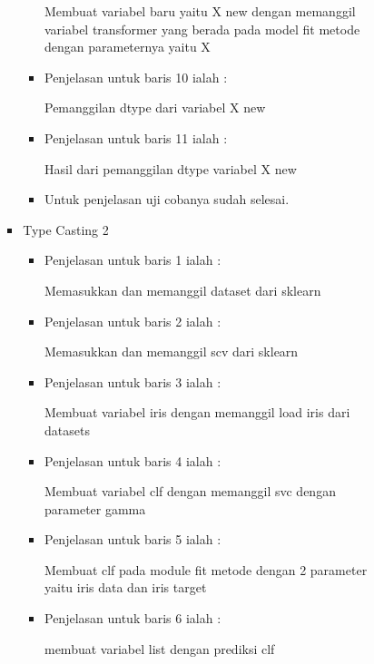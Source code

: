 \begin{enumerate}
\begin{itemize}
\begin{enumerate}
\begin{itemize}
\begin{itemize}
\par Membuat variabel baru yaitu X new dengan memanggil variabel transformer yang berada pada model fit metode dengan parameternya yaitu X
\par
\item Penjelasan untuk baris 10 ialah :
\par Pemanggilan dtype dari variabel X new
\par
\item Penjelasan untuk baris 11 ialah :
\par Hasil dari pemanggilan dtype variabel X new
\par
\item Untuk penjelasan uji cobanya sudah selesai.
\par
\end{itemize}
\end{itemize}
\par
\par
\begin{itemize}
\item Type Casting 2
\par
\begin{itemize}
\item Penjelasan untuk baris 1 ialah : 
\par Memasukkan dan memanggil dataset dari sklearn
\par
\par
\item Penjelasan untuk baris 2 ialah :
\par Memasukkan dan memanggil scv dari sklearn
\par
\item Penjelasan untuk baris 3  ialah :
\par Membuat variabel iris dengan memanggil load iris dari datasets
\par
\item Penjelasan untuk baris 4  ialah :
\par Membuat variabel clf dengan memanggil svc dengan parameter gamma
\par
\item Penjelasan untuk baris 5  ialah :
\par Membuat clf pada module fit metode dengan 2 parameter yaitu iris data dan iris target
\par
\item Penjelasan untuk baris 6 ialah :
\par membuat variabel list dengan prediksi clf
\par

\end{itemize}
\end{itemize}
\end{enumerate}
\end{itemize}
\end{enumerate}
